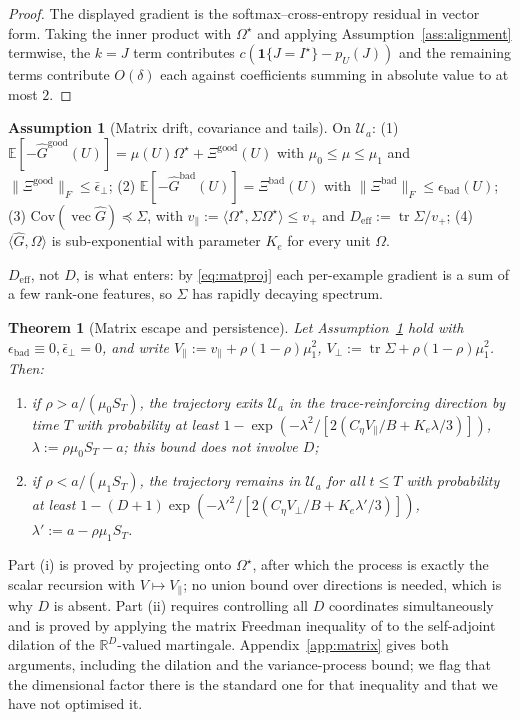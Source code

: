 \documentclass{article}
\theoremstyle{plain}
\newtheorem{theorem}{Theorem}
\theoremstyle{definition}
\newtheorem{assumption}{Assumption}
\theoremstyle{remark}
\newcommand{\E}{\mathbb{E}}
\newcommand{\R}{\mathbb{R}}
\newcommand{\1}{\mathbf{1}}
\newcommand{\cU}{\mathcal{U}}
\newcommand{\good}{\mathrm{good}}
\newcommand{\bad}{\mathrm{bad}}
\newcommand{\Tr}{\operatorname{tr}}
\newcommand{\vecop}{\operatorname{vec}}
\newcommand{\Om}{\Omega}
\begin{document}
\begin{proof}
The displayed gradient is the softmax--cross-entropy residual in vector form.
Taking the inner product with $\Om^\star$ and applying
Assumption~\ref{ass:alignment} termwise, the $k=J$ term contributes
$c(\1\{J=I^\star\}-p_U(J))$ and the remaining terms contribute $O(\delta)$ each
against coefficients summing in absolute value to at most $2$.
\end{proof}

\begin{assumption}[Matrix drift, covariance and tails]
\label{ass:matrix}
On $\cU_a$: (1) $\E[-\hat G^\good(U)] = \mu(U)\Om^\star+\Xi^\good(U)$ with
$\mu_0\le\mu\le\mu_1$ and $\|\Xi^\good\|_F\le\bar\epsilon_\perp$;
(2) $\E[-\hat G^\bad(U)] = \Xi^\bad(U)$ with $\|\Xi^\bad\|_F\le\epsilon_\bad(U)$;
(3) $\mathrm{Cov}(\vecop\hat G)\preceq\Sigma$, with
$v_\parallel := \langle\Om^\star,\Sigma\Om^\star\rangle\le v_+$ and
$D_{\mathrm{eff}} := \Tr\Sigma/v_+$;
(4) $\langle\hat G,\Om\rangle$ is sub-exponential with parameter $K_e$ for every
unit $\Om$.
\end{assumption}

$D_{\mathrm{eff}}$, not $D$, is what enters: by \eqref{eq:matproj} each
per-example gradient is a sum of a few rank-one features, so $\Sigma$ has rapidly
decaying spectrum.

\begin{theorem}[Matrix escape and persistence]
\label{thm:matrixescape}
Let Assumption~\ref{ass:matrix} hold with
$\epsilon_\bad\equiv0,\bar\epsilon_\perp = 0$, and write
$V_\parallel := v_\parallel+\rho(1-\rho)\mu_1^2$,
$V_\perp := \Tr\Sigma+\rho(1-\rho)\mu_1^2$. Then:
\begin{enumerate}[leftmargin=*,itemsep=2pt]
\item[(i)] if $\rho > a/(\mu_0S_T)$, the trajectory exits $\cU_a$ in the
trace-reinforcing direction by time $T$ with probability at least
$1-\exp(-\lambda^2/[2(C_\eta V_\parallel/B+K_e\lambda/3)])$,
$\lambda := \rho\mu_0S_T-a$; \emph{this bound does not involve $D$};
\item[(ii)] if $\rho < a/(\mu_1S_T)$, the trajectory remains in $\cU_a$ for all
$t\le T$ with probability at least
$1-(D+1)\exp(-\lambda'^2/[2(C_\eta V_\perp/B+K_e\lambda'/3)])$,
$\lambda' := a-\rho\mu_1S_T$.
\end{enumerate}
\end{theorem}

Part (i) is proved by projecting onto $\Om^\star$, after which the process is
exactly the scalar recursion with $V\mapsto V_\parallel$; no union bound over
directions is needed, which is why $D$ is absent. Part (ii) requires controlling
all $D$ coordinates simultaneously and is proved by applying the matrix Freedman
inequality of \citet{tropp2011freedman} to the self-adjoint dilation of the
$\R^D$-valued martingale. Appendix~\ref{app:matrix} gives both arguments,
including the dilation and the variance-process bound; we flag that the
dimensional factor there is the standard one for that inequality and that we have
not optimised it.
\end{document}
